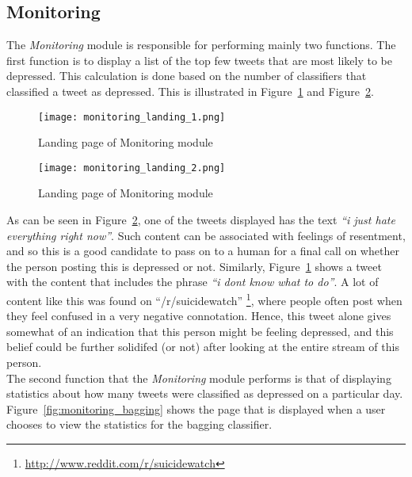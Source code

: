 \subsection{Monitoring}
The \emph{Monitoring} module is responsible for performing mainly two functions. The first function is to display a list of the top few tweets that are most likely to be depressed. This calculation is done based on the number of classifiers that classified a tweet as depressed. This is illustrated in Figure~\ref{fig:monitoring_landing_1} and Figure~\ref{fig:monitoring_landing_2}.\\

\begin{figure}
    \centering
    \texttt{[image: monitoring\_landing\_1.png]}
    \caption{Landing page of Monitoring module}
    \label{fig:monitoring_landing_1}
\end{figure}

\begin{figure}
    \centering
    \texttt{[image: monitoring\_landing\_2.png]}
    \caption{Landing page of Monitoring module}
    \label{fig:monitoring_landing_2}
\end{figure}

As can be seen in Figure~\ref{fig:monitoring_landing_2}, one of the tweets displayed has the text \emph{``i just hate everything right now''}. Such content can be associated with feelings of resentment, and so this is a good candidate to pass on to a human for a final call on whether the person posting this is depressed or not. Similarly, Figure~\ref{fig:monitoring_landing_1} shows a tweet with the content that includes the phrase \emph{``i dont know what to do''}. A lot of content like this was found on ``/r/suicidewatch'' \footnote{\url{http://www.reddit.com/r/suicidewatch}}, where people often post when they feel confused in a very negative connotation. Hence, this tweet alone gives somewhat of an indication that this person might be feeling depressed, and this belief could be further solidifed (or not) after looking at the entire stream of this person.\\

The second function that the \emph{Monitoring} module performs is that of displaying statistics about how many tweets were classified as depressed on a particular day. Figure~\ref{fig:monitoring_bagging} shows the page that is displayed when a user chooses to view the statistics for the bagging classifier.\\

